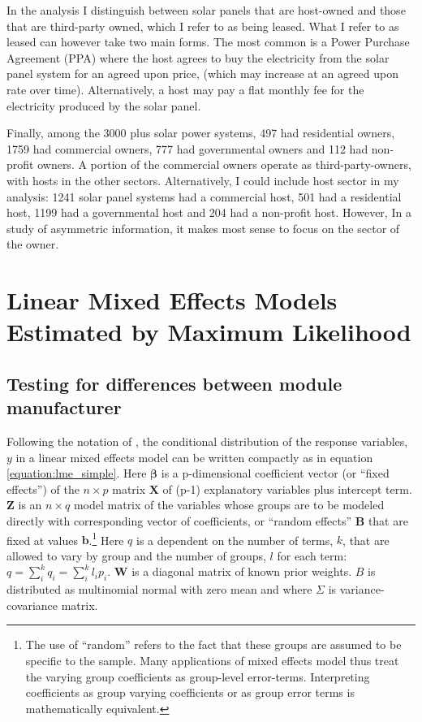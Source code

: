 \documentclass[a4paper]{article}
\begin{document}
In the analysis I distinguish between solar panels that are host-owned and those that are third-party owned, which I refer to as being leased. What I refer to as leased can however take two main forms. The most common is a Power Purchase Agreement (PPA) where the host agrees to buy the electricity from the solar panel system for an agreed upon price, (which may increase at an agreed upon rate over time). Alternatively, a host may pay a flat monthly fee for the electricity produced by the solar panel.

Finally, among the 3000 plus solar power systems, 497 had residential owners, 1759 had commercial owners, 777 had governmental owners and 112 had non-profit owners. A portion of the commercial owners operate as third-party-owners, with hosts in the other sectors. Alternatively, I could include host sector in my analysis: 1241 solar panel systems had a commercial host, 501 had a residential host, 1199 had a governmental host and 204 had a non-profit host. However, In a study of asymmetric information, it makes most sense to focus on the sector of the owner.


\section{Linear Mixed Effects Models Estimated by Maximum Likelihood}

\subsection{Testing for differences between module manufacturer}
Following the notation of \citet{bates_fitting_2015}, the conditional distribution of the response variables, $y$ in a linear mixed effects model can be written compactly as in equation \ref{equation:lme_simple}. Here $\mathbf{\beta}$ is a p-dimensional coefficient vector (or  ``fixed effects'') of the $n \times p$ matrix $\mathbf{X}$ of (p-1) explanatory variables plus intercept term. $\mathbf{Z}$ is an $n \times q$ model matrix of the variables whose groups are to be modeled directly with corresponding vector of coefficients, or ``random effects'' $\mathbf{B}$ that are fixed at values $\mathbf{b}$.\footnote{The use of ``random'' refers to the fact that these groups are assumed to be specific to the sample. Many applications of mixed effects model thus treat the varying group coefficients as group-level error-terms. Interpreting coefficients as group varying coefficients or as group error terms is mathematically equivalent.} Here $q$ is a dependent on the number of terms, $k$, that are allowed to vary by group and the number of groups, $l$ for each term: $q=\sum_i^k q_i = \sum_i^k l_i p_i$.  $\mathbf{W}$ is a diagonal matrix of known prior weights. $B$ is distributed as multinomial normal with zero mean and where $\Sigma$ is variance-covariance matrix.
\end{document}
